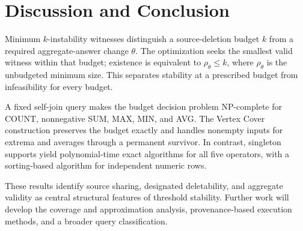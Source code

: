 \section{Discussion and Conclusion}
\label{sec:conclusion}

Minimum $k$-instability witnesses distinguish a source-deletion budget $k$
from a required aggregate-answer change $\theta$. The optimization seeks
the smallest valid witness within that budget; existence is equivalent to
$\rho_\theta\le k$, where $\rho_\theta$ is the unbudgeted minimum size.
This separates stability at a prescribed budget from infeasibility for
every budget.

A fixed self-join query makes the budget decision problem NP-complete for
COUNT, nonnegative SUM, MAX, MIN, and AVG. The Vertex Cover construction
preserves the budget exactly and handles nonempty inputs for extrema and
averages through a permanent survivor. In contrast, singleton supports
yield polynomial-time exact algorithms for all five operators, with a
sorting-based algorithm for independent numeric rows.

These results identify source sharing, designated deletability, and
aggregate validity as central structural features of threshold stability.
Further work will develop the coverage and approximation analysis,
provenance-based execution methods, and a broader query classification.
